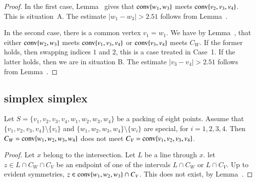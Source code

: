 \begin{tarskidata}
\begin{tarski}
\begin{proof}
In the first case, Lemma~ gives that ${\operatorname{conv}}\{w_1,w_3\}$
meets ${\operatorname{conv}}\{v_2,v_3,v_4\}$.  This is situation~A.  The estimate
$|w_1-w_3|>2.51$ follows from Lemma~.\FIXX{$\CalE$}

In the second case, there is a common vertex $v_1=w_1$.  We have
by Lemma~, that either ${\operatorname{conv}}\{w_2,w_3\}$ meets
${\operatorname{conv}}\{v_1,v_3,v_4\}$ or ${\operatorname{conv}}\{v_3,v_4\}$ meets
$C_W$.  If the former holds, then swapping indices $1$ and $2$,
this is a case treated in Case~1.  If the latter holds, then
we are in situation B.  The estimate $|v_3-v_4|>2.51$ follows
from Lemma~.\FIXX{$\CalE$}
\end{proof}
\end{tarski}







\begin{tarski}
\subsection{simplex simplex}

\begin{lemma}
Let $S=\{v_1,v_2,v_3,v_4,w_1,w_2,w_3,w_4\}$ be a packing of eight
points.
Assume that $\{v_1,v_2,v_3,v_4\}\setminus\{v_i\}$ and
$\{w_1,w_2,w_3,w_4\}\setminus\{w_i\}$ are special, for $i=1,2,3,4$.
Then $C_W ={\operatorname{conv}}\{w_1,w_2,w_3,w_4\}$ does not meet
$C_V = {\operatorname{conv}}\{v_1,v_2,v_3,v_4\}$.
\end{lemma}

\begin{proof}
Let $x$ belong to the intersection.  Let $L$ be a line through
$x$.  let $z\in L\cap C_W\cap C_V$ be an endpoint of one of the
intervals $L\cap C_W$ or $L\cap C_V$.  Up to evident symmetries,
$z\in {\operatorname{conv}}\{w_1,w_2,w_3\}\cap C_V$.  This does not exist,
by Lemma~.
\end{proof}
\end{tarski}





\begin{tarski}


\end{tarski}
\end{tarskidata}
